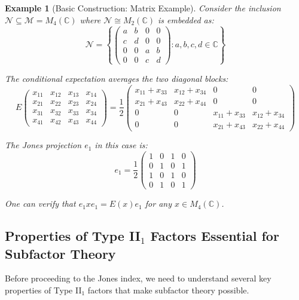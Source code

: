 \documentclass[11pt, a4paper]{article}
\theoremstyle{colored_def}
\theoremstyle{colored_thm}
\theoremstyle{colored_ex}
\newtheorem{example}{Example}[section]
\newcommand{\C}{\mathbb{C}}
\newcommand{\M}{\mathcal{M}}
\newcommand{\N}{\mathcal{N}}
\begin{document}
\begin{example}[Basic Construction: Matrix Example]\label{ex:basic-construction-matrix}
Consider the inclusion $\N \subseteq \M = M_4(\C)$ where $\N \cong M_2(\C)$ is embedded as:
$$ \N = \left\{ \begin{pmatrix} a & b & 0 & 0 \\ c & d & 0 & 0 \\ 0 & 0 & a & b \\ 0 & 0 & c & d \end{pmatrix} : a,b,c,d \in \C \right\} $$

The conditional expectation averages the two diagonal blocks:
$$ E\begin{pmatrix} x_{11} & x_{12} & x_{13} & x_{14} \\ x_{21} & x_{22} & x_{23} & x_{24} \\ x_{31} & x_{32} & x_{33} & x_{34} \\ x_{41} & x_{42} & x_{43} & x_{44} \end{pmatrix} = \frac{1}{2}\begin{pmatrix} x_{11}+x_{33} & x_{12}+x_{34} & 0 & 0 \\ x_{21}+x_{43} & x_{22}+x_{44} & 0 & 0 \\ 0 & 0 & x_{11}+x_{33} & x_{12}+x_{34} \\ 0 & 0 & x_{21}+x_{43} & x_{22}+x_{44} \end{pmatrix} $$

The Jones projection $e_1$ in this case is:
$$ e_1 = \frac{1}{2}\begin{pmatrix} 1 & 0 & 1 & 0 \\ 0 & 1 & 0 & 1 \\ 1 & 0 & 1 & 0 \\ 0 & 1 & 0 & 1 \end{pmatrix} $$

One can verify that $e_1 x e_1 = E(x) e_1$ for any $x \in M_4(\C)$.
\end{example}

\subsection{Properties of Type II$_1$ Factors Essential for Subfactor Theory}

Before proceeding to the Jones index, we need to understand several key properties of Type II$_1$ factors that make subfactor theory possible.
\end{document}
